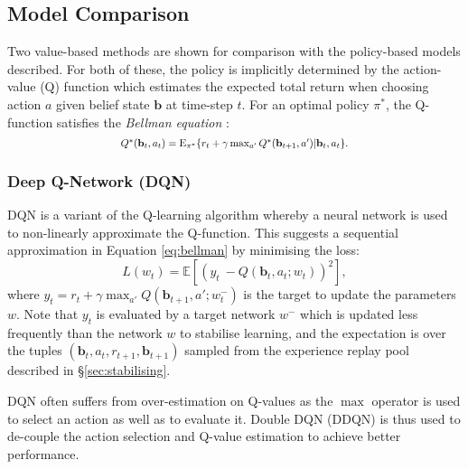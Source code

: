 \documentclass[11pt,a4paper]{article}
\newcommand*{\Scale}[2][4]{\scalebox{#1}{$#2$}}%
\begin{document}
\subsection{Model Comparison}
Two value-based methods are shown for comparison with the policy-based models described.
For both of these, the policy is implicitly determined by the action-value (Q) function which estimates the expected total return when choosing action $a$ given belief state $\mathbf{b}$ at time-step $t$. For an optimal policy $\pi^*$, the Q-function satisfies the {\it Bellman equation} \cite{bellman1954theory}:
\begin{equation}\label{eq:bellman}
\Scale[0.82]{Q^*(\mathbf{b}_t, a_t) = \text{E}_{\pi^*}  \{ r_t + \gamma \max_{a'} Q^*(\mathbf{b}_{t+1}, a') | \mathbf{b}_t, a_t\}.}
\end{equation}

\subsubsection{Deep Q-Network (DQN)}
DQN is a variant of the Q-learning algorithm whereby a neural network is used to non-linearly approximate the Q-function.
This suggests a sequential approximation
in Equation \ref{eq:bellman} by minimising the loss:
\begin{equation} \label{eq:dqnloss}
L(w_t) = \mathbb{E}\left[(y_t~ - Q(\mathbf{b}_t,a_t;w_t))^2 \right],
\end{equation}
where $y_t = r_t + \gamma \max_{a'}Q(\mathbf{b}_{t+1}, a';w^{-}_t)$ is the target to update the parameters $w$.
Note that $y_t$ is evaluated by a target network $w^{-}$ which is updated less frequently than the network $w$ to stabilise learning,
and the expectation is over the tuples $(\mathbf{b}_t, a_t, r_{t+1}, \mathbf{b}_{t+1})$ sampled from the experience replay pool described in \S \ref{sec:stabilising}. 

DQN often suffers from over-estimation on Q-values as the $\max$ operator is used to select an action as well as to evaluate it. 
Double DQN (DDQN) \cite{van2016deep} is thus used to de-couple the action selection and Q-value estimation to achieve better performance.
 
\end{document}
